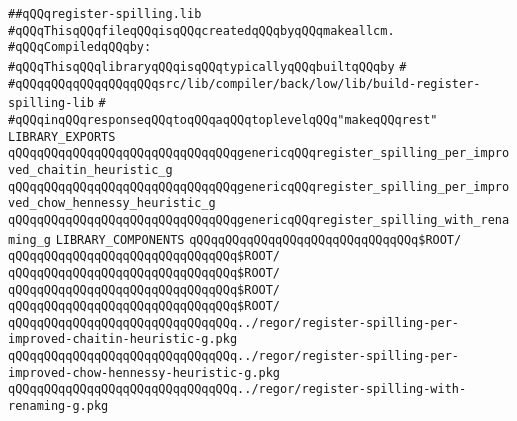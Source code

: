 \label{src/lib/compiler/back/low/lib/register-spilling.lib}
\verb|##qQQqregister-spilling.lib|\newline
\verb|#qQQqThisqQQqfileqQQqisqQQqcreatedqQQqbyqQQqmakeallcm.|\newline
\newline
\verb|#qQQqCompiledqQQqby:|\newline
\newline
\verb|#qQQqThisqQQqlibraryqQQqisqQQqtypicallyqQQqbuiltqQQqby|\newline
\verb|#|\newline
\verb|#qQQqqQQqqQQqqQQqqQQqsrc/lib/compiler/back/low/lib/build-register-spilling-lib|\newline
\verb|#|\newline
\verb|#qQQqinqQQqresponseqQQqtoqQQqaqQQqtoplevelqQQq"makeqQQqrest"|\newline
\newline
\verb|LIBRARY_EXPORTS|\newline
\newline
\verb|qQQqqQQqqQQqqQQqqQQqqQQqqQQqqQQqgenericqQQqregister_spilling_per_improved_chaitin_heuristic_g|\newline
\verb|qQQqqQQqqQQqqQQqqQQqqQQqqQQqqQQqgenericqQQqregister_spilling_per_improved_chow_hennessy_heuristic_g|\newline
\verb|qQQqqQQqqQQqqQQqqQQqqQQqqQQqqQQqgenericqQQqregister_spilling_with_renaming_g|\newline
\newline
\newline
\newline
\verb|LIBRARY_COMPONENTS|\newline
\newline
\verb|qQQqqQQqqQQqqQQqqQQqqQQqqQQqqQQq$ROOT/|\newline
\newline
\verb|qQQqqQQqqQQqqQQqqQQqqQQqqQQqqQQq$ROOT/|\newline
\verb|qQQqqQQqqQQqqQQqqQQqqQQqqQQqqQQq$ROOT/|\newline
\verb|qQQqqQQqqQQqqQQqqQQqqQQqqQQqqQQq$ROOT/|\newline
\verb|qQQqqQQqqQQqqQQqqQQqqQQqqQQqqQQq$ROOT/|\newline
\newline
\verb|qQQqqQQqqQQqqQQqqQQqqQQqqQQqqQQq../regor/register-spilling-per-improved-chaitin-heuristic-g.pkg|\newline
\verb|qQQqqQQqqQQqqQQqqQQqqQQqqQQqqQQq../regor/register-spilling-per-improved-chow-hennessy-heuristic-g.pkg|\newline
\verb|qQQqqQQqqQQqqQQqqQQqqQQqqQQqqQQq../regor/register-spilling-with-renaming-g.pkg|\newline

